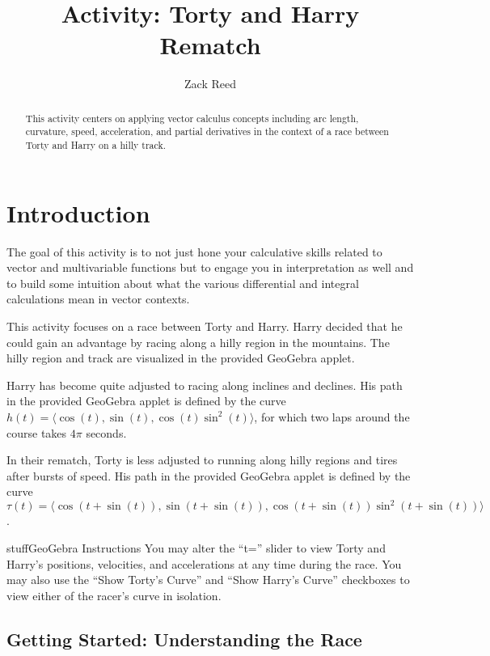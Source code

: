 \documentclass{ximera}
\title{Activity: Torty and Harry Rematch}
\author{Zack Reed}
\begin{document}
\begin{abstract}
This activity centers on applying vector calculus concepts including arc length, curvature, speed, acceleration, and partial derivatives in the context of a race between Torty and Harry on a hilly track.
\end{abstract}
\maketitle

\section*{Introduction}

The goal of this activity is to not just hone your calculative skills related to vector and multivariable functions but to engage you in interpretation as well and to build some intuition about what the various differential and integral calculations mean in vector contexts.

This activity focuses on a race between Torty and Harry. Harry decided that he could gain an advantage by racing along a hilly region in the mountains. The hilly region and track are visualized in the provided GeoGebra applet.

Harry has become quite adjusted to racing along inclines and declines. His path in the provided GeoGebra applet is defined by the curve $h(t)=\langle \cos(t), \sin(t), \cos(t)\sin^2(t)\rangle$, for which two laps around the course takes $4 \pi$ seconds.

In their rematch, Torty is less adjusted to running along hilly regions and tires after bursts of speed. His path in the provided GeoGebra applet is defined by the curve $\tau (t)=\langle \cos(t+\sin(t)), \sin(t+\sin(t)), \cos(t+\sin(t))\sin^2(t+\sin(t))\rangle$.

\begin{expandable}{stuff}{GeoGebra Instructions}
    You may alter the ``t='' slider to view Torty and Harry's positions, velocities, and accelerations at any time during the race. You may also use the ``Show Torty's Curve'' and ``Show Harry's Curve'' checkboxes to view either of the racer's curve in isolation.
\end{expandable}

\begin{center}
\end{center}

\subsection*{Getting Started: Understanding the Race}
\end{document}
